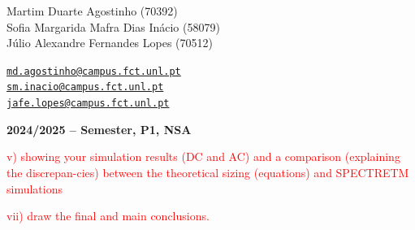 \documentclass[12pt]{article}
\begin{document}
\begin{center}
    \begin{minipage}{0.5\textwidth}
        \begin{flushleft}
            Martim Duarte Agostinho (70392)\\
            Sofia Margarida Mafra Dias Inácio (58079)\\
            Júlio Alexandre Fernandes Lopes (70512)\\
        \end{flushleft}
    \end{minipage}%
    \begin{minipage}{0.5\textwidth}
        \begin{flushright}
            \href{mailto:md.agostinho@campus.fct.unl.pt}{\texttt{md.agostinho@campus.fct.unl.pt}}\\
            \href{mailto:sm.inacio@campus.fct.unl.pt}{\texttt{sm.inacio@campus.fct.unl.pt}}\\
            \href{mailto:jafe.lopes@campus.fct.unl.pt}{\texttt{jafe.lopes@campus.fct.unl.pt}}
        \end{flushright}
    \end{minipage}
\end{center}
 

\vspace{4cm}

\begin{center}
    \large \bf 2024/2025 --  Semester, P1, NSA
\end{center}

\thispagestyle{empty}

\setcounter{page}{0}

\newpage

\newpage

\tableofcontents %

\vspace{4cm}

\newpage

\listoffigures

\listoftables

\newpage

% 







\textcolor{red}{v) showing your simulation results (DC and AC) and a comparison (explaining the discrepan-cies) between the theoretical sizing (equations) and SPECTRETM simulations}


\textcolor{red}{vii) draw the final and main conclusions.}

\newpage

\end{document}
